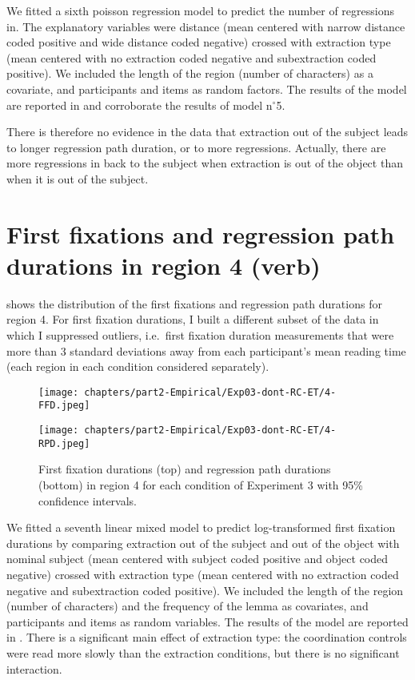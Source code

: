 

We fitted a sixth poisson regression model to predict the number of regressions in. The explanatory variables were distance (mean centered with narrow distance coded positive and wide distance coded negative) crossed with extraction type (mean centered with no extraction coded negative and subextraction coded positive). We included the length of the region (number of characters) as a covariate, and participants and items as random factors. 
The results of the model are reported in  and corroborate the results of model n$^{\circ}$5. 



There is therefore no evidence in the data that extraction out of the subject leads to longer regression path duration, or to more regressions. Actually, there are more regressions in back to the subject when extraction is out of the object than when it is out of the subject. 

\section{First fixations and regression path durations in region 4 (verb)}

 shows the distribution of the first fixations and regression path durations for region 4. For first fixation durations, I built a different subset of the data in which I suppressed outliers, i.e.\ first fixation duration measurements that were more than 3 standard deviations away from each participant's mean reading time (each region in each condition considered separately). 

\begin{figure}
    \centering
    \texttt{[image: chapters/part2-Empirical/Exp03-dont-RC-ET/4-FFD.jpeg]}
    
    \texttt{[image: chapters/part2-Empirical/Exp03-dont-RC-ET/4-RPD.jpeg]}
    \caption{First fixation durations (top) and regression path durations (bottom) in region 4 for each condition of Experiment 3 with 95\% confidence intervals.}
    \label{fig:exp03-4-RPD}
\end{figure}

We fitted a seventh linear mixed model to predict log-transformed first fixation durations by comparing extraction out of the subject and out of the object with nominal subject (mean centered with subject coded positive and object coded negative) crossed with extraction type (mean centered with no extraction coded negative and subextraction coded positive). We included the length of the region (number of characters) and the frequency of the lemma as covariates, and participants and items as random variables. 
The results of the model are reported in . There is a significant main effect of extraction type: the coordination controls were read more slowly than the extraction conditions, but there is no significant interaction.

